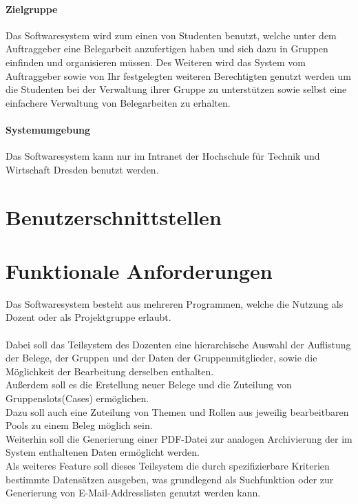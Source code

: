 \documentclass{article}
\begin{document}
\subsection{Zielgruppe}
Das Softwaresystem wird zum einen von Studenten benutzt, welche unter dem Auftraggeber eine Belegarbeit anzufertigen haben und sich dazu in Gruppen einfinden und organisieren müssen.
Des Weiteren wird das System vom Auftraggeber sowie von Ihr festgelegten weiteren Berechtigten genutzt werden um die Studenten bei der Verwaltung ihrer Gruppe zu unterstützen sowie selbst eine einfachere Verwaltung von Belegarbeiten zu erhalten.
\subsection{Systemumgebung}
Das Softwaresystem kann nur im Intranet der Hochschule für Technik und Wirtschaft Dresden benutzt werden. 

\newpage
\part{Benutzerschnittstellen}


\newpage
\part{Funktionale Anforderungen}

Das Softwaresystem besteht aus mehreren Programmen, welche die Nutzung als Dozent oder als Projektgruppe erlaubt.\\\\

Dabei soll das Teilsystem des Dozenten eine hierarchische Auswahl der Auflistung der Belege, der Gruppen und der Daten der Gruppenmitglieder, sowie die Möglichkeit der Bearbeitung derselben enthalten.\\
Außerdem soll es die Erstellung neuer Belege und die Zuteilung von Gruppenslots(Cases) ermöglichen.\\
Dazu soll auch eine Zuteilung von Themen und Rollen aus jeweilig bearbeitbaren Pools zu einem Beleg möglich sein.\\
Weiterhin soll die Generierung einer PDF-Datei zur analogen Archivierung der im System enthaltenen Daten ermöglicht werden.\\
Als weiteres Feature soll dieses Teilsystem die durch spezifizierbare Kriterien bestimmte Datensätzen ausgeben, was grundlegend als Suchfunktion oder zur Generierung von E-Mail-Addresslisten genutzt werden kann.\\\\
\end{document}

